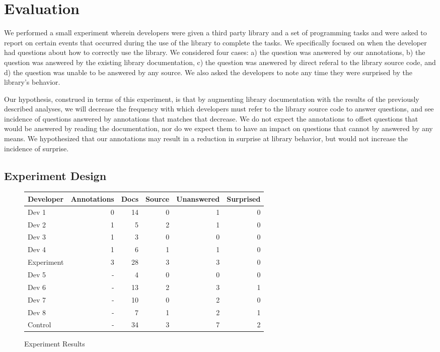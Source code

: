 \section{Evaluation}
\label{sec:Evaluation}

We performed a small experiment wherein developers were given a third party
library and a set of programming tasks and were asked to report on certain
events that occurred during the use of the library to complete the tasks. We
specifically focused on when the developer had questions about how to correctly
use the library. We considered four cases: a) the question was answered by our
annotations, b) the question was answered by the existing library
documentation, c) the question was answered by direct referal to the library
source code, and d) the question was unable to be answered by any source. We
also asked the developers to note any time they were surprised by the library's
behavior.

Our hypothesis, construed in terms of this experiment, is that by augmenting
library documentation with the results of the previously described analyses, we
will decrease the frequency with which developers must refer to the library
source code to answer questions, and see incidence of questions answered by
annotations that matches that decrease. We do not expect the annotations to
offset questions that would be answered by reading the documentation, nor do we
expect them to have an impact on questions that cannot by answered by any
means. We hypothesized that our annotations may result in a reduction in
surprise at library behavior, but would not increase the incidence of surprise.

\subsection{Experiment Design}

\begin{figure*}
\centering
\begin{tabular}{ l r r r r r }
Developer & Annotations & Docs & Source & Unanswered & Surprised \\
\hline
Dev 1 & 0 & 14 & 0 & 1 & 0 \\
Dev 2 & 1 &  5 & 2 & 1 & 0 \\
Dev 3 & 1 &  3 & 0 & 0 & 0 \\
Dev 4 & 1 &  6 & 1 & 1 & 0 \\
\hline
Experiment & 3 & 28 & 3 & 3 & 0 \\
\hline
Dev 5 & - &  4 & 0 & 0 & 0 \\
Dev 6 & - & 13 & 2 & 3 & 1 \\
Dev 7 & - & 10 & 0 & 2 & 0 \\
Dev 8 & - &  7 & 1 & 2 & 1 \\
\hline
Control & - & 34 & 3 & 7 & 2 \\
\hline
\end{tabular}
\caption{Experiment Results}
\label{fig:exp_results}
\end{figure*}

